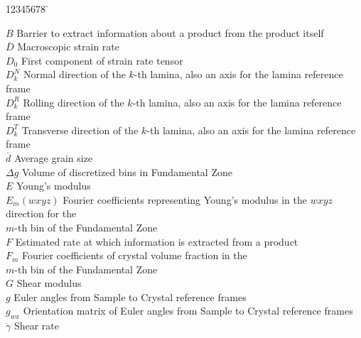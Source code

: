 %
%
%
%

\begin{tabbing}
12345678 \= \kill

$B$             \> Barrier to extract information about a product from the product itself\\
$\overline{D}$  \> Macroscopic strain rate\\
$D_{0}$                 \> First component of strain rate tensor\\
$D^{N}_{k}$         \> Normal direction of the $k$-th lamina, also an axis for the lamina reference frame\\
$D^{R}_{k}$         \> Rolling direction of the $k$-th lamina, also an axis for the lamina reference frame\\
$D^{T}_{k}$         \> Transverse direction of the $k$-th lamina, also an axis for the lamina reference frame\\
$\overline{d}$  \> Average grain size\\
$\Delta g$          \> Volume of discretized bins in Fundamental Zone\\
$E$                         \> Young's modulus\\
$E_m(wxyz)$     \> Fourier coefficients representing Young's modulus in the $wxyz$ direction for the\\
                                \> $m$-th bin of the Fundamental Zone\\
$F$             \> Estimated rate at which information is extracted from a product\\
$F_m$               \> Fourier coefficients of crystal volume fraction in the\\
                \> $m$-th bin of the Fundamental Zone\\
$G$                         \> Shear modulus\\
$g$                     \> Euler angles from Sample to Crystal reference frames\\
$g_{wx}$            \> Orientation matrix of Euler angles from Sample to Crystal reference frames\\
$\dot \gamma$       \> Shear rate\\

\end{tabbing}
